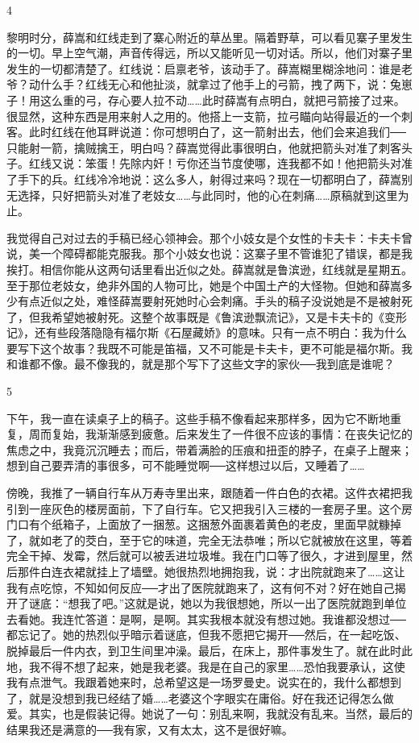 4 

黎明时分，薛嵩和红线走到了寨心附近的草丛里。隔着野草，可以看见寨子里发生的一切。早上空气潮，声音传得远，所以又能听见一切对话。所以，他们对寨子里发生的一切都清楚了。红线说：启禀老爷，该动手了。薛嵩糊里糊涂地问：谁是老爷？动什么手？红线无心和他扯淡，就拿过了他手上的弓箭，拽了两下，说：兔崽子！用这么重的弓，存心要人拉不动……此时薛嵩有点明白，就把弓箭接了过来。很显然，这种东西是用来射人之用的。他搭上一支箭，拉弓瞄向站得最近的一个刺客。此时红线在他耳畔说道：你可想明白了，这一箭射出去，他们会来追我们──只能射一箭，擒贼擒王，明白吗？薛嵩觉得此事很明白，他就把箭头对准了刺客头子。红线又说：笨蛋！先除内奸！亏你还当节度使哪，连我都不如！他把箭头对准了手下的兵。红线冷冷地说：这么多人，射得过来吗？现在一切都明白了，薛嵩别无选择，只好把箭头对准了老妓女……与此同时，他的心在刺痛……原稿就到这里为止。 

我觉得自己对过去的手稿已经心领神会。那个小妓女是个女性的卡夫卡：卡夫卡曾说，美一个障碍都能克服我。那个小妓女也说：这寨子里不管谁犯了错误，都是我挨打。相信你能从这两句话里看出近似之处。薛嵩就是鲁滨逊，红线就是星期五。至于那位老妓女，绝非外国的人物可比，她是个中国土产的大怪物。但她和薛嵩多少有点近似之处，难怪薛嵩要射死她时心会刺痛。手头的稿子没说她是不是被射死了，但我希望她被射死。这整个故事既是《鲁滨逊飘流记》，又是卡夫卡的《变形记》，还有些段落隐隐有福尔斯《石屋藏娇》的意味。只有一点不明白：我为什么要写下这个故事？我既不可能是笛福，又不可能是卡夫卡，更不可能是福尔斯。我和谁都不像。最不像我的，就是那个写下了这些文字的家伙──我到底是谁呢？ 

5 

下午，我一直在读桌子上的稿子。这些手稿不像看起来那样多，因为它不断地重复，周而复始，我渐渐感到疲惫。后来发生了一件很不应该的事情：在丧失记忆的焦虑之中，我竟沉沉睡去；而后，带着满脸的压痕和扭歪的脖子，在桌子上醒来；想到自己要弄清的事很多，可不能睡觉啊──这样想过以后，又睡着了…… 

傍晚，我推了一辆自行车从万寿寺里出来，跟随着一件白色的衣裙。这件衣裙把我引到一座灰色的楼房面前，下了自行车。它又把我引入三楼的一套房子里。这个房门口有个纸箱子，上面放了一捆葱。这捆葱外面裹着黄色的老皮，里面早就糠掉了，就如老了的茭白，至于它的味道，完全无法恭唯；所以它就被放在这里，等着完全干掉、发霉，然后就可以被丢进垃圾堆。我在门口等了很久，才进到屋里，然后那件白连衣裙就挂上了墙壁。她很热烈地拥抱我，说：才出院就跑来了……这让我有点吃惊，不知如何反应──才出了医院就跑来了，这有何不对？好在她自己揭开了谜底：“想我了吧。”这就是说，她以为我很想她，所以一出了医院就跑到单位去看她。我连忙答道：是啊，是啊。其实我根本就没有想过她。我谁都没想过──都忘记了。她的热烈似乎暗示着谜底，但我不愿把它揭开──然后，在一起吃饭、脱掉最后一件内衣，到卫生间里冲澡。最后，在床上，那件事发生了。就在此时此地，我不得不想了起来，她是我老婆。我是在自己的家里……恐怕我要承认，这使我有点泄气。我跟着她来时，总希望这是一场罗曼史。说实在的，我什么都想到了，就是没想到我已经结了婚……老婆这个字眼实在庸俗。好在我还记得怎么做爱。其实，也是假装记得。她说了一句：别乱来啊，我就没有乱来。当然，最后的结果我还是满意的──我有家，又有太太，这不是很好嘛。 

